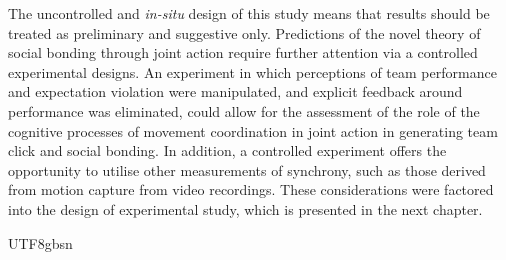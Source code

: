 \begin{CJK}{UTF8}{gbsn}

The uncontrolled and \textit{in-situ} design of this study means that results should be treated as preliminary and suggestive only.  Predictions of the novel theory of social bonding through joint action require further attention via a controlled experimental designs.  An experiment in which perceptions of team performance and expectation violation were manipulated, and explicit feedback around performance was eliminated, could allow for the assessment of the role of the cognitive processes of movement coordination in joint action in generating team click and social bonding.  In addition, a controlled experiment offers the opportunity to utilise other measurements of synchrony, such as those derived from motion capture from video recordings.  These considerations were factored into the design of experimental study, which is presented in the next chapter.


                                                \end{CJK}{UTF8}{gbsn}
